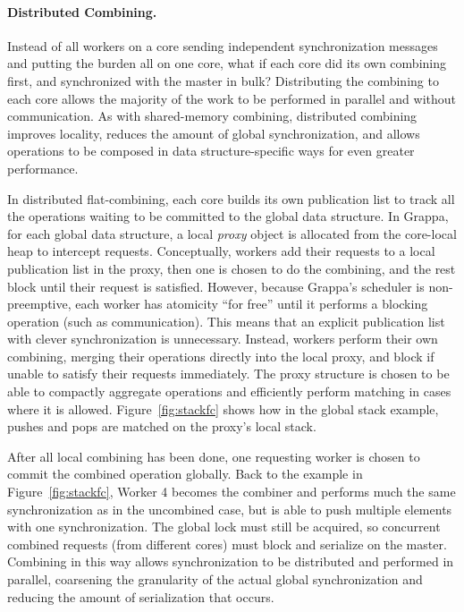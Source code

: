 \paragraph{Distributed Combining.}
Instead of all workers on a core sending independent synchronization messages and putting the burden all on one core, what if each core did its own combining first, and synchronized with the master in bulk?
Distributing the combining to each core allows the majority of the work to be performed in parallel and without communication.
As with shared-memory combining, distributed combining improves locality, reduces the amount of global synchronization, and allows operations to be composed in data structure-specific ways for even greater performance.


In distributed flat-combining, each core builds its own publication list to track all the operations waiting to be committed to the global data structure.
In Grappa, for each global data structure, a local \emph{proxy} object is allocated from the core-local heap to intercept requests.
Conceptually, workers add their requests to a local publication list in the proxy, then one is chosen to do the combining, and the rest block until their request is satisfied.
However, because Grappa's scheduler is non-preemptive, each worker has atomicity ``for free'' until it performs a blocking operation (such as communication).
This means that an explicit publication list with clever synchronization is unnecessary.
Instead, workers perform their own combining, merging their operations directly into the local proxy, and block if unable to satisfy their requests immediately.
The proxy structure is chosen to be able to compactly aggregate operations and efficiently perform matching in cases where it is allowed. Figure~\ref{fig:stackfc} shows how in the global stack example, pushes and pops are matched on the proxy's local stack.

After all local combining has been done, one requesting worker is chosen to commit the combined operation globally. Back to the example in Figure~\ref{fig:stackfc}, Worker 4 becomes the combiner and performs much the same synchronization as in the uncombined case, but is able to push multiple elements with one synchronization. The global lock must still be acquired, so concurrent combined requests (from different cores) must block and serialize on the master. Combining in this way allows synchronization to be distributed and performed in parallel, coarsening the granularity of the actual global synchronization and reducing the amount of serialization that occurs.

